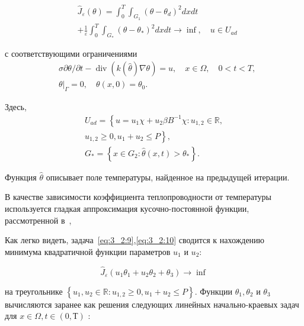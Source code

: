 \begin{equation}
    \label{eq:3_2:9}
    \begin{aligned}
        &\widehat{J}_{\varepsilon}(\theta)=\int_{0}^{T}
        \int_{G_{1}}\left(\theta-\theta_{d}\right)^{2} d x d t \\
        &+\frac{1}{\varepsilon} \int_{0}^{T}
        \int_{G_{*}}\left(\theta-\theta_{*}\right)^{2} d x d t
        \rightarrow \inf , \quad u \in U_{a d}
    \end{aligned}
\end{equation}

с соответствующими ограничениями
\begin{equation}
    \label{eq:3_2:10}
    \begin{aligned}
        &\sigma \partial \theta / \partial t-\operatorname{div}(k(\widehat{\theta})
        \nabla \theta)=u, \quad x \in \Omega, \quad 0<t<T, \\
        &\left.\theta\right|_{\Gamma}=0, \quad \theta(x, 0)=\theta_{0}.
    \end{aligned}
\end{equation}

Здесь,
\[
    \begin{gathered}
        U_{a d}=\left\{u=u_{1} \chi+u_{2} \beta B^{-1} \chi: u_{1,2} \in \mathbb{R},\right. \\
        \left.u_{1,2} \geq 0, u_{1}+u_{2} \leq P\right\}, \\
        G_{*}=\left\{x \in G_{2}: \hat{\theta}(x, t)>\theta_{*}\right\}.
    \end{gathered}
\]

Функция $\widehat{\theta}$ описывает поле температуры,
найденное на предыдущей итерации.

В качестве зависимости коэффициента теплопроводности от температуры используется
гладкая аппроксимация кусочно-постоянной функции, рассмотренной
в~\cite{Opticalthermal_vanRuijven2014, Some_Poluektova2014, Endovenous_Malskat2014},

Как легко видеть, задача~\eqref{eq:3_2:9},\eqref{eq:3_2:10} сводится к
нахождению минимума квадратичной функции параметров $u_{1}$ и $u_{2}$:

\[
    \widehat{J}_{\varepsilon}\left(u_{1} \theta_{1}+u_{2} \theta_{2}+\theta_{3}\right) \rightarrow \inf
\]

на треугольнике  $\left\{u_{1}, u_{2} \in \mathbb{R}: u_{1,2} \geq 0, u_{1}+u_{2} \leq P\right\}$.
Функции $\theta_{1}, \theta_{2}$ и $\theta_{3}$ вычисляются заранее как решения следующих линейных
начально-краевых задач для $x \in \Omega, t \in(0, Т)$ :



